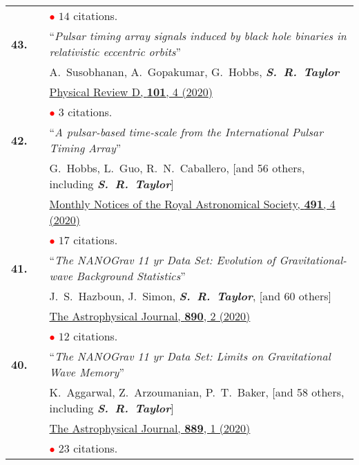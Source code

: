 \documentclass[11pt,letterpaper,sans]{moderncv}
\begin{document}
{\begin{longtable}{rp{0.3cm}p{15.8cm}}
&& \textcolor{red}{$\bullet$} $14$ citations. \vspace{0.09cm}\\
\textbf{43.} & & ``\textit{Pulsar timing array signals induced by black hole binaries in relativistic eccentric orbits}'' \\ 
&&A.~Susobhanan, A.~Gopakumar, G.~Hobbs, \textit{\textbf{S.~R.~Taylor}}\\
&& \href{https://ui.adsabs.harvard.edu/link_gateway/2020PhRvD.101d3022S/PUB_HTML}{{\color{color1} Physical Review D, \textbf{101}, 4 (2020)}} \\
&& \textcolor{red}{$\bullet$} $3$ citations. \vspace{0.09cm}\\
\textbf{42.} & & ``\textit{A pulsar-based time-scale from the International Pulsar Timing Array}'' \\ 
&&G.~Hobbs, L.~Guo, R.~N.~Caballero, [and 56 others, including \textit{\textbf{S.~R.~Taylor}}] \\
&& \href{https://ui.adsabs.harvard.edu/link_gateway/2020MNRAS.491.5951H/PUB_HTML}{{\color{color1} Monthly Notices of the Royal Astronomical Society, \textbf{491}, 4 (2020)}} \\
&& \textcolor{red}{$\bullet$} $17$ citations. \vspace{0.09cm}\\
\textbf{41.} & & ``\textit{The NANOGrav 11 yr Data Set: Evolution of Gravitational-wave Background Statistics}'' \\ 
&&J.~S.~Hazboun, J.~Simon, \textit{\textbf{S.~R.~Taylor}}, [and 60 others] \\
&& \href{https://ui.adsabs.harvard.edu/link_gateway/2020ApJ...890..108H/PUB_HTML}{{\color{color1} The Astrophysical Journal, \textbf{890}, 2 (2020)}} \\
&& \textcolor{red}{$\bullet$} $12$ citations. \vspace{0.09cm}\\
\textbf{40.} & & ``\textit{The NANOGrav 11 yr Data Set: Limits on Gravitational Wave Memory}'' \\ 
&&K.~Aggarwal, Z.~Arzoumanian, P.~T.~Baker, [and 58 others, including \textit{\textbf{S.~R.~Taylor}}] \\
&& \href{https://iopscience.iop.org/article/10.3847/1538-4357/ab6083}{{\color{color1} The Astrophysical Journal, \textbf{889}, 1 (2020)}} \\
&& \textcolor{red}{$\bullet$} $23$ citations. \vspace{0.09cm}\\

\end{longtable}}
\end{document}
